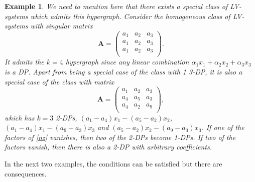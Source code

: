 \documentclass{article}
\newcounter{NN}
\newtheorem{example}[NN]{Example}
\def\A{\mathbf{A}}
\begin{document}
\begin{example}
We need to mention here that there exists a special class of LV-systems which admits this hypergraph. Consider the homogeneous class of LV-systems with singular matrix
\[
\A=\begin{pmatrix}
a_1 & a_2 & a_3 \\
a_1 & a_2 & a_3 \\
a_1 & a_2 & a_3 \\
\end{pmatrix}.
\]
It admits the $k=4$ hypergraph since any linear combination $\alpha_1x_1+\alpha_2x_2+\alpha_3x_3$ is a DP. Apart from being a special case of the class with 1 3-DP, it is also a special case of the class with matrix
\[
\A=\begin{pmatrix}
a_1 & a_2 & a_3 \\
a_4 & a_5 & a_3 \\
a_4 & a_2 & a_9 \\
\end{pmatrix},
\]
which has $k=3$ 2-DPs,
$\left(a_{1}-a_{4}\right) x_{1}-\left(a_{5}-a_{2}\right) x_{2}$,
$\left(a_{1}-a_{4}\right) x_{1}-\left(a_{9}-a_{3}\right) x_{3}$ and $\left(a_{5}-a_{2}\right) x_{2}-\left(a_{9}-a_{3}\right) x_{3}$.
If one of the factors of \eqref{nz} vanishes, then two of the 2-DPs become 1-DPs. If two of the factors vanish, then there is also a 2-DP with arbitrary coefficients.
\end{example}
In the next two examples, the conditions can be satisfied but there are consequences.
\end{document}
